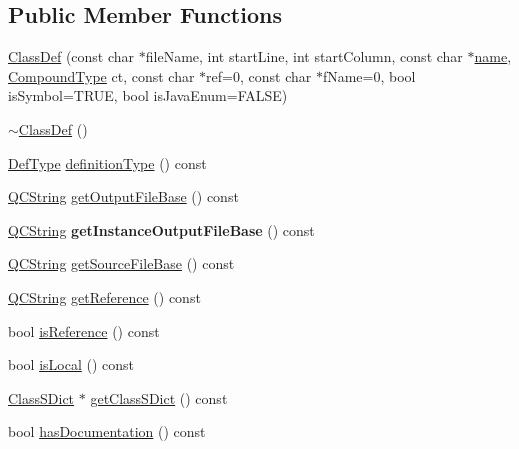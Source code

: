 \subsection*{Public Member Functions}
\begin{DoxyCompactItemize}
\item 
\mbox{\hyperlink{class_class_def_a333dcbd4c69ab13830072caaf0d9db62}{Class\+Def}} (const char $\ast$file\+Name, int start\+Line, int start\+Column, const char $\ast$\mbox{\hyperlink{class_definition_a9324000f785d7b6b098878a3bca4df5b}{name}}, \mbox{\hyperlink{class_class_def_ae70cf86d35fe954a94c566fbcfc87939}{Compound\+Type}} ct, const char $\ast$ref=0, const char $\ast$f\+Name=0, bool is\+Symbol=T\+R\+UE, bool is\+Java\+Enum=F\+A\+L\+SE)
\item 
\mbox{\hyperlink{class_class_def_a22b4fd0ea9984ffeef4b0650549a7621}{$\sim$\+Class\+Def}} ()
\item 
\mbox{\hyperlink{class_definition_intf_ada60114bc621669dd8c19edfc6421766}{Def\+Type}} \mbox{\hyperlink{class_class_def_ab84f56a99816a73920785d48a059c769}{definition\+Type}} () const
\item 
\mbox{\hyperlink{class_q_c_string}{Q\+C\+String}} \mbox{\hyperlink{class_class_def_a0031d083ee93ea5a0337051b4bc97719}{get\+Output\+File\+Base}} () const
\item 
\mbox{\label{class_class_def_a260ec827b20d579c85a1ed04f670b64d}} 
\mbox{\hyperlink{class_q_c_string}{Q\+C\+String}} {\bfseries get\+Instance\+Output\+File\+Base} () const
\item 
\mbox{\hyperlink{class_q_c_string}{Q\+C\+String}} \mbox{\hyperlink{class_class_def_a35e351146e4ce259ee129551a167f0bd}{get\+Source\+File\+Base}} () const
\item 
\mbox{\hyperlink{class_q_c_string}{Q\+C\+String}} \mbox{\hyperlink{class_class_def_aa19a0146566892e3f947698762d6e3e8}{get\+Reference}} () const
\item 
bool \mbox{\hyperlink{class_class_def_a9a6dbef98acabb06d9e1792e3c82c800}{is\+Reference}} () const
\item 
bool \mbox{\hyperlink{class_class_def_a9fb4287aacaa5dd5723c03d93d7c9d93}{is\+Local}} () const
\item 
\mbox{\hyperlink{class_class_s_dict}{Class\+S\+Dict}} $\ast$ \mbox{\hyperlink{class_class_def_afc398c93456eb0c801adc3fc3a5929f0}{get\+Class\+S\+Dict}} () const
\item 
bool \mbox{\hyperlink{class_class_def_acb106b87cabffd7dcf3c7b692f61454b}{has\+Documentation}} () const

\end{DoxyCompactItemize}
